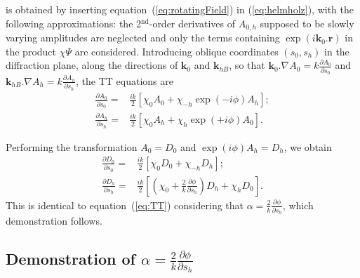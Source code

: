 \documentclass{iucr}
\begin{document}
is obtained by inserting equation~(\ref{eq:rotatingField}) in (\ref{eq:helmholz}), with the following approximations: the 2$^{\text{nd}}$-order derivatives of $A_{0,h}$ supposed to be slowly varying amplitudes are neglected and only the terms containing $\exp(i\textbf{k}_0.\textbf{r})$ in the product $\chi\Psi$ are considered. Introducing oblique coordinates $(s_0,s_h)$ in the diffraction plane, along the directions of $\textbf{k}_0$ and $\textbf{k}_{hB}$, so that $\textbf{k}_0.\nabla A_0=k\frac{\partial A_0}{\partial s_0}$ and  $\textbf{k}_{hB}.\nabla A_h=k\frac{\partial A_h}{\partial s_h}$, the TT equations are
\begin{subequations}
\begin{align}
\frac{\partial A_0}{\partial s_0} =& \frac{ik}{2} \left[ \chi_0 A_0+ \chi_{-h} \exp(-i\phi) A_h\right]; \nonumber \\
\frac{\partial A_h}{\partial s_h} =& \frac{ik}{2} \left[ \chi_0 A_h+ \chi_{h} \exp(+i\phi) A_0 \right]. \nonumber
\end{align}
\end{subequations}

Performing the transformation $A_0=D_0$ and $\exp(i\phi) A_h=D_h$, we obtain
\begin{subequations}
\begin{align}
\frac{\partial D_0}{\partial s_0} =& \frac{ik}{2} \left[ \chi_0 D_0+ \chi_{-h} D_h\right]; \\
\frac{\partial D_h}{\partial s_h} =& \frac{ik}{2} \left[ (\chi_0 + \frac{2}{k}\frac{\partial\phi}{\partial s_h} ) D_h+ \chi_{h} D_0\right].
\end{align}
\end{subequations}
This is identical to equation~(\ref{eq:TT}) considering that $\alpha=\frac{2}{k}\frac{\partial\phi}{\partial s_h}$, which demonstration follows.

\subsection{Demonstration of $\alpha=\frac{2}{k}\frac{\partial\phi}{\partial s_h}$ }
\end{document}
